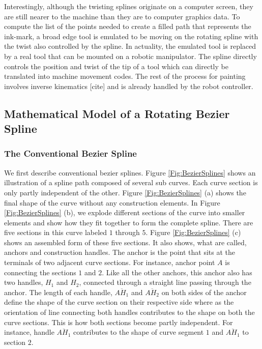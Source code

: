     Interestingly, although the twisting splines originate on a computer screen, they are still nearer to the machine than they are to computer graphics data. To compute the list of the points needed to create a filled path that represents the ink-mark, a broad edge tool is emulated to be moving on the rotating spline with the twist also controlled by the spline. In actuality, the emulated tool is replaced by a real tool that can be mounted on a robotic manipulator. The spline directly controls the position and twist of the tip of a tool which can directly be translated into machine movement codes. The rest of the process for painting involves inverse kinematics [cite] and is already handled by the robot controller.

    \subsection{Mathematical Model of a Rotating Bezier Spline}
    \subsubsection{The Conventional Bezier Spline}
         We first describe conventional bezier splines. Figure \ref{Fig:BezierSplines} shows an illustration of a spline path composed of several sub curves. Each curve section is only partly independent of the other. Figure \ref{Fig:BezierSplines} (a) shows the final shape of the curve without any construction elements. In Figure \ref{Fig:BezierSplines} (b), we explode different sections of the curve into smaller elements and show how they fit together to form the complete spline. There are five sections in this curve labeled $1$ through $5$. Figure \ref{Fig:BezierSplines} (c) shows an assembled form of these five sections. It also shows, what are called, anchors and construction handles. The anchor is the point that sits at the terminals of two adjacent curve sections. For instance, anchor point $A$  is connecting the sections $1$ and $2$. Like all the other anchors, this anchor also has two handles, $H_1$ and $H_2$, connected through a straight line passing through the anchor. The length of each handle, $\overline{AH_1}$  and $\overline{AH_2}$ on both sides of the anchor define the shape of the curve section on their respective side where as the orientation of line connecting both handles contributes to the shape on both the curve sections. This is how both sections become partly independent. For instance, handle $\overline{AH_1}$ contributes to the shape of curve segment $1$ and $\overline{AH_1}$ to section $2$.



